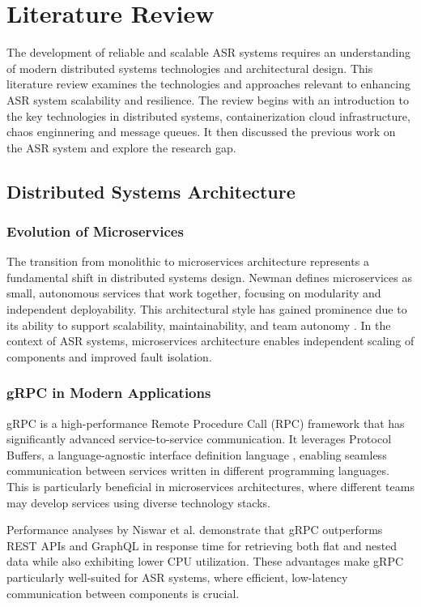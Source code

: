 \chapter{Literature Review} \label{chapter:literature_review}
The development of reliable and scalable ASR systems requires an understanding of modern distributed systems technologies and architectural design. This literature review examines the technologies and approaches relevant to enhancing ASR system scalability and resilience. The review begins with an introduction to the key technologies in distributed systems, containerization cloud infrastructure, chaos enginnering and message queues. It then discussed the previous work on the ASR system and explore the research gap.

\section{Distributed Systems Architecture}
\subsection{Evolution of Microservices}
The transition from monolithic to microservices architecture represents a fundamental shift in distributed systems design. Newman \cite{newman} defines microservices as small, autonomous services that work together, focusing on modularity and independent deployability. This architectural style has gained prominence due to its ability to support scalability, maintainability, and team autonomy \cite{microservices_benefits}. In the context of ASR systems, microservices architecture enables independent scaling of components and improved fault isolation.

\subsection{gRPC in Modern Applications}
gRPC is a high-performance Remote Procedure Call (RPC) framework \cite{grpc} that has significantly advanced service-to-service communication. It leverages Protocol Buffers, a language-agnostic interface definition language \cite{protocol_buffers}, enabling seamless communication between services written in different programming languages. This is particularly beneficial in microservices architectures, where different teams may develop services using diverse technology stacks. 

Performance analyses by Niswar et al. \cite{grpc_comparison} demonstrate that gRPC outperforms REST APIs and GraphQL in response time for retrieving both flat and nested data while also exhibiting lower CPU utilization. These advantages make gRPC particularly well-suited for ASR systems, where efficient, low-latency communication between components is crucial.

